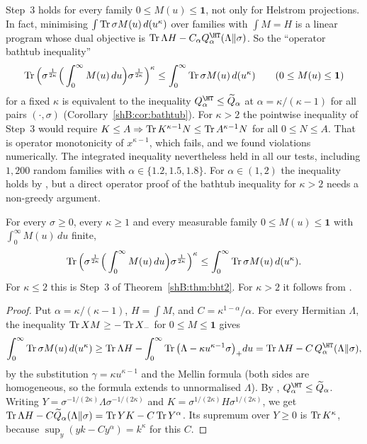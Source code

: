 \begin{remark}\label{shB:rem:bhtdual}
Step~3 holds for every family $0\le M(u)\le\mathbf 1$, not only for Helstrom projections. In fact, minimising $\int\operatorname{Tr}\sigma M(u)\,d(u^\kappa)$ over families with $\int M=H$ is a linear program whose dual objective is $\Tr\Lambda H-C_\alpha Q^\HT_\alpha(\Lambda\|\sigma)$. So the ``operator bathtub inequality''
\[
\operatorname{Tr}\Big(\sigma^{\frac1{2\kappa}}\Big(\int_0^\infty M(u)\,du\Big)\sigma^{\frac1{2\kappa}}\Big)^\kappa\le\int_0^\infty\operatorname{Tr}\sigma M(u)\,d(u^\kappa)\qquad(0\le M(u)\le\mathbf 1)
\]
for a fixed $\kappa$ is equivalent to the inequality $Q^\HT_\alpha\le\widetilde Q_\alpha$ at $\alpha=\kappa/(\kappa-1)$ for all pairs $(\cdot,\sigma)$ (Corollary~\ref{shB:cor:bathtub}). For $\kappa>2$ the pointwise inequality of Step~3 would require $K\le A\Rightarrow\operatorname{Tr} K^{\kappa-1}N\le\operatorname{Tr} A^{\kappa-1}N$ for all $0\le N\le A$. That is operator monotonicity of $x^{\kappa-1}$, which fails, and we found violations numerically. The integrated inequality nevertheless held in all our tests, including $1{,}200$ random families with $\alpha\in\{1.2,1.5,1.8\}$. For $\alpha\in(1,2)$ the inequality holds by \cite{LiuHircheCheng2025}, but a direct operator proof of the bathtub inequality for $\kappa>2$ needs a non-greedy argument.
\end{remark}

\begin{corollary}\label{shB:cor:bathtub}
For every $\sigma\ge0$, every $\kappa\ge1$ and every measurable family $0\le M(u)\le\mathbf 1$ with $\int_0^\infty M(u)\,du$ finite,
\[
\operatorname{Tr}\Big(\sigma^{\frac1{2\kappa}}\Big(\int_0^\infty M(u)\,du\Big)\sigma^{\frac1{2\kappa}}\Big)^\kappa\le\int_0^\infty\operatorname{Tr}\sigma M(u)\,d(u^\kappa).
\]
For $\kappa\le2$ this is Step~3 of Theorem~\ref{shB:thm:bht2}. For $\kappa>2$ it follows from \cite{LiuHircheCheng2025}.
\end{corollary}

\begin{proof}
Put $\alpha=\kappa/(\kappa-1)$, $H=\int M$, and $C=\kappa^{1-\alpha}/\alpha$. For every Hermitian $\Lambda$, the inequality $\operatorname{Tr} XM\ge-\operatorname{Tr} X_-$ for $0\le M\le\mathbf 1$ gives
\[
\int_0^\infty\Tr\sigma M(u)\,d(u^\kappa)\ge\Tr\Lambda H-\int_0^\infty\Tr\big(\Lambda-\kappa u^{\kappa-1}\sigma\big)_+du=\Tr\Lambda H-C\,Q^\HT_\alpha(\Lambda\|\sigma),
\]
by the substitution $\gamma=\kappa u^{\kappa-1}$ and the Mellin formula (both sides are homogeneous, so the formula extends to unnormalised $\Lambda$). By \cite{LiuHircheCheng2025}, $Q^\HT_\alpha\le\widetilde Q_\alpha$. Writing $Y=\sigma^{-1/(2\kappa)}\Lambda\sigma^{-1/(2\kappa)}$ and $K=\sigma^{1/(2\kappa)}H\sigma^{1/(2\kappa)}$, we get $\operatorname{Tr}\Lambda H-C\widetilde Q_\alpha(\Lambda\|\sigma)=\operatorname{Tr} YK-C\operatorname{Tr} Y^\alpha$. Its supremum over $Y\ge0$ is $\operatorname{Tr} K^\kappa$, because $\sup_y(yk-Cy^\alpha)=k^\kappa$ for this $C$.
\end{proof}

